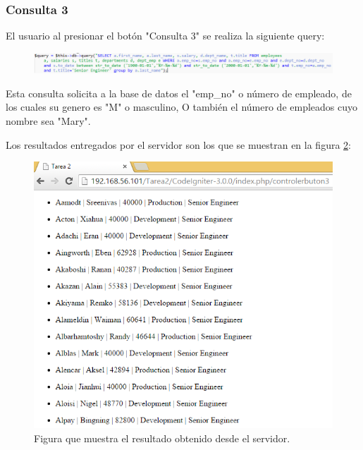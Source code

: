 \subsubsection{Consulta 3}

El usuario al presionar el botón "Consulta 3" se realiza la siguiente query:

\begin{figure}[htb]
	\label{Figura6}
	\begin{center}
		\includegraphics[scale=0.7]{imagenes/query3.png}
	\end{center}
\end{figure}

Esta consulta solicita a la base de datos el "emp\_no" o número de empleado, de los cuales su genero es "M" o masculino, O también el número de empleados cuyo nombre sea "Mary".

Los resultados entregados por el servidor son los que se muestran en la figura \ref{Figura7}:

\begin{figure}[htb]
	\label{Figura7}
	\begin{center}
		\includegraphics[scale=0.7]{imagenes/resultado3.png}
		\caption{Figura que muestra el resultado obtenido desde el servidor.}
	\end{center}
\end{figure}

